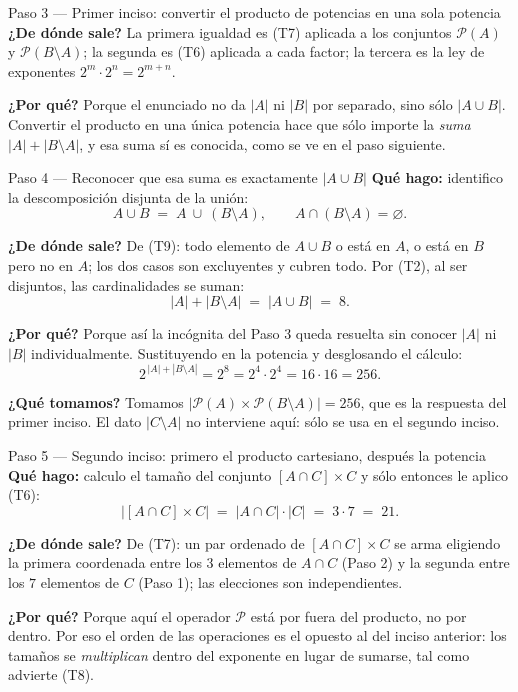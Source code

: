 \documentclass[11pt]{article}
\begin{document}
\begin{sol}
\begin{paso}{Paso 3 --- Primer inciso: convertir el producto de potencias en una sola potencia}
\textbf{¿De dónde sale?} La primera igualdad es (T7) aplicada a los conjuntos $\mathcal{P}(A)$ y $\mathcal{P}(B\setminus A)$; la segunda es (T6) aplicada a cada factor; la tercera es la ley de exponentes $2^{m}\cdot 2^{n} = 2^{m+n}$.

\textbf{¿Por qué?} Porque el enunciado no da $|A|$ ni $|B|$ por separado, sino sólo $|A\cup B|$. Convertir el producto en una única potencia hace que sólo importe la \emph{suma} $|A| + |B\setminus A|$, y esa suma sí es conocida, como se ve en el paso siguiente.
\end{paso}

\begin{paso}{Paso 4 --- Reconocer que esa suma es exactamente $|A\cup B|$}
\textbf{Qué hago:} identifico la descomposición disjunta de la unión:
\[
A\cup B \;=\; A\ \cup\ (B\setminus A), \qquad A\cap (B\setminus A) = \varnothing .
\]

\textbf{¿De dónde sale?} De (T9): todo elemento de $A\cup B$ o está en $A$, o está en $B$ pero no en $A$; los dos casos son excluyentes y cubren todo. Por (T2), al ser disjuntos, las cardinalidades se suman:
\[
|A| + |B\setminus A| \;=\; |A\cup B| \;=\; 8 .
\]

\textbf{¿Por qué?} Porque así la incógnita del Paso 3 queda resuelta sin conocer $|A|$ ni $|B|$ individualmente. Sustituyendo en la potencia y desglosando el cálculo:
\[
2^{\,|A|+|B\setminus A|} = 2^{8} = 2^{4}\cdot 2^{4} = 16\cdot 16 = 256 .
\]

\textbf{¿Qué tomamos?} Tomamos $|\mathcal{P}(A)\times \mathcal{P}(B\setminus A)| = 256$, que es la respuesta del primer inciso. El dato $|C\setminus A|$ no interviene aquí: sólo se usa en el segundo inciso.
\end{paso}

\begin{paso}{Paso 5 --- Segundo inciso: primero el producto cartesiano, después la potencia}
\textbf{Qué hago:} calculo el tamaño del conjunto $[A\cap C]\times C$ y sólo entonces le aplico (T6):
\[
|[A\cap C]\times C| \;=\; |A\cap C|\cdot |C| \;=\; 3\cdot 7 \;=\; 21 .
\]

\textbf{¿De dónde sale?} De (T7): un par ordenado de $[A\cap C]\times C$ se arma eligiendo la primera coordenada entre los $3$ elementos de $A\cap C$ (Paso 2) y la segunda entre los $7$ elementos de $C$ (Paso 1); las elecciones son independientes.

\textbf{¿Por qué?} Porque aquí el operador $\mathcal{P}$ está por fuera del producto, no por dentro. Por eso el orden de las operaciones es el opuesto al del inciso anterior: los tamaños se \emph{multiplican} dentro del exponente en lugar de sumarse, tal como advierte (T8).


\end{paso}
\end{sol}
\end{document}
